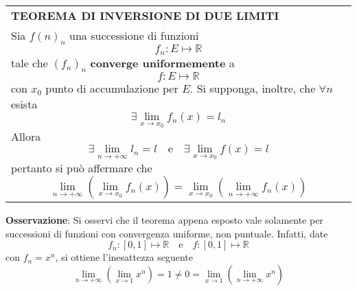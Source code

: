 \documentclass[a4paper]{extarticle}
\renewcommand\arraystretch{}
\begin{document}
\vspace{1em}
\setlength{\tabcolsep}{14pt}
\renewcommand{\arraystretch}{2}
\noindent
\begin{tabularx}{\textwidth}{@{}|P|@{}}
    \hline
    {\textbf{TEOREMA DI INVERSIONE DI DUE LIMITI}}\\
    \parbox{\linewidth}{Sia $f(n)_n$ una successione di funzioni
    \[f_n : E \longmapsto \mathbb{R}\]
    tale che $(f_n)_n$ \textbf{converge uniformemente} a
    \[f : E \longmapsto \mathbb{R}\]
    con $x_0$ punto di accumulazione per $E$. Si supponga, inoltre, che $\forall n$ esista
    \[\exists \lim_{x \to x_0} f_n(x) = l_n\]
    Allora
    \[\exists \lim_{n \to +\infty} l_n = l \hspace{1em} \text{e} \hspace{1em} \exists \lim_{x \to x_0} f(x) = l\]
    pertanto si può affermare che
    \[\lim_{n \to +\infty} \left(\lim_{x \to x_0} f_n(x)\right) = \lim_{x \to x_0} \left(\lim_{n \to +\infty} f_n(x)\right)\] \vspace{-1mm}}\\
    \hline
\end{tabularx}

\vspace{2em}
\noindent
\textbf{Osservazione}: Si osservi che il teorema appena esposto vale solamente per successioni di funzioni con convergenza uniforme, non puntuale. Infatti, date
\[f_n : [0,1] \longmapsto \mathbb{R} \hspace{1em} \text{e} \hspace{1em} f : [0,1] \longmapsto \mathbb{R}\]
con $f_n=x^n$, si ottiene l'inesattezza seguente
\[\lim_{n \to +\infty} \left(\lim_{x \to 1} x^n\right) = 1 \neq 0 = \lim_{x \to 1} \left(\lim_{n \to +\infty} x^n\right)\]
\end{document}
